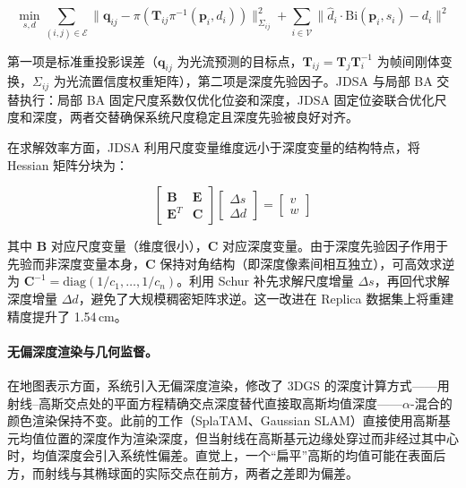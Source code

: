 \begin{equation}
\min_{s, d} \sum_{(i,j) \in \mathcal{E}} \| \mathbf{q}_{ij} - \pi(\mathbf{T}_{ij} \pi^{-1}(\mathbf{p}_i, d_i)) \|_{\Sigma_{ij}}^2 + \sum_{i \in \mathcal{V}} \| \hat{d}_i \cdot \mathrm{Bi}(\mathbf{p}_i, s_i) - d_i \|^2
\end{equation}

第一项是标准重投影误差（$\mathbf{q}_{ij}$ 为光流预测的目标点，$\mathbf{T}_{ij} = \mathbf{T}_j\mathbf{T}_i^{-1}$ 为帧间刚体变换，$\Sigma_{ij}$ 为光流置信度权重矩阵），第二项是深度先验因子。JDSA 与局部 BA 交替执行：局部 BA 固定尺度系数仅优化位姿和深度，JDSA 固定位姿联合优化尺度和深度，两者交替确保系统尺度稳定且深度先验被良好对齐。

在求解效率方面，JDSA 利用尺度变量维度远小于深度变量的结构特点，将 Hessian 矩阵分块为：

\begin{equation}
\begin{bmatrix} \mathbf{B} & \mathbf{E} \\ \mathbf{E}^T & \mathbf{C} \end{bmatrix} \begin{bmatrix} \Delta s \\ \Delta d \end{bmatrix} = \begin{bmatrix} v \\ w \end{bmatrix}
\end{equation}

其中 $\mathbf{B}$ 对应尺度变量（维度很小），$\mathbf{C}$ 对应深度变量。由于深度先验因子作用于先验而非深度变量本身，$\mathbf{C}$ 保持对角结构（即深度像素间相互独立），可高效求逆为 $\mathbf{C}^{-1} = \mathrm{diag}(1/c_1, \ldots, 1/c_n)$。利用 Schur 补先求解尺度增量 $\Delta s$，再回代求解深度增量 $\Delta d$，避免了大规模稠密矩阵求逆。这一改进在 Replica 数据集上将重建精度提升了 1.54\,cm。

\paragraph{无偏深度渲染与几何监督。}
在地图表示方面，系统引入无偏深度渲染，修改了 3DGS 的深度计算方式——用射线--高斯交点处的平面方程精确交点深度替代直接取高斯均值深度——$\alpha$-混合的颜色渲染保持不变。此前的工作（SplaTAM、Gaussian SLAM）直接使用高斯基元均值位置的深度作为渲染深度，但当射线在高斯基元边缘处穿过而非经过其中心时，均值深度会引入系统性偏差。直觉上，一个``扁平''高斯的均值可能在表面后方，而射线与其椭球面的实际交点在前方，两者之差即为偏差。

